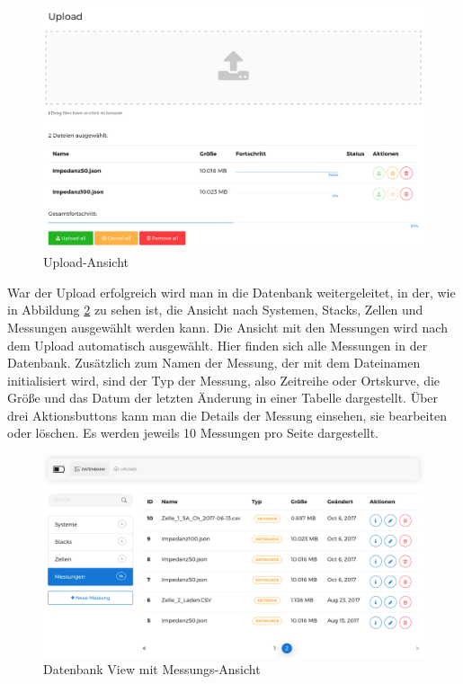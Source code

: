 \begin{figure}
\centering
\includegraphics[width=\textwidth]{Figures/upload}
\caption{Upload-Ansicht}
\label{fig:upload}
\end{figure}

War der Upload erfolgreich wird man in die Datenbank weitergeleitet, in der, wie in Abbildung \ref{fig:messungen} zu sehen ist, die Ansicht nach Systemen, Stacks, Zellen und Messungen ausgewählt werden kann. Die Ansicht mit den Messungen wird nach dem Upload automatisch ausgewählt. Hier finden sich alle Messungen in der Datenbank. Zusätzlich zum Namen der Messung, der mit dem Dateinamen initialisiert wird, sind der Typ der Messung, also Zeitreihe oder Ortskurve, die Größe und das Datum der letzten Änderung in einer Tabelle dargestellt. Über drei Aktionsbuttons kann man die Details der Messung einsehen, sie bearbeiten oder löschen. Es werden jeweils 10 Messungen pro Seite dargestellt.

\begin{figure}
\centering
\includegraphics[width=\textwidth]{Figures/messungen}
\caption{Datenbank View mit Messungs-Ansicht}
\label{fig:messungen}
\end{figure}

